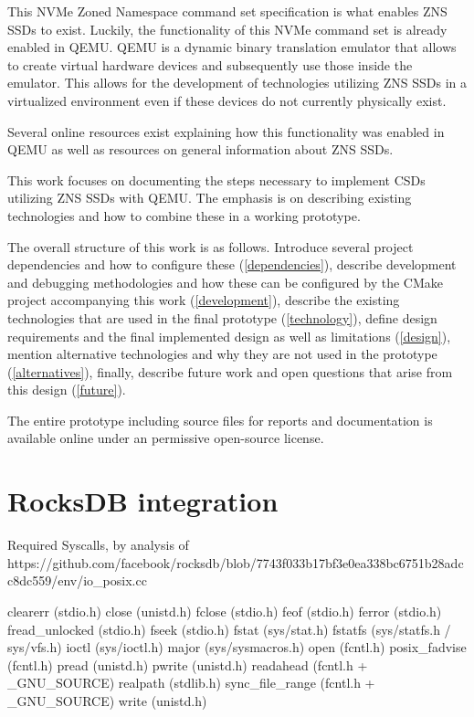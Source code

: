 \documentclass[conference]{IEEEtran}
\begin{document}
This NVMe Zoned Namespace command set specification is what enables ZNS SSDs to
exist\cite{nvme-zns}. Luckily, the functionality of this NVMe command set is
already enabled in QEMU. QEMU is a dynamic binary translation emulator that
allows to create virtual hardware devices and subsequently use those inside the
emulator. This allows for the development of technologies utilizing ZNS SSDs in
a virtualized environment even if these devices do not currently physically
exist.

Several online resources exist explaining how this functionality was enabled in
QEMU\cite{nvme-qemu-1,nvme-qemu-2} as well as resources on general information
about ZNS SSDs\cite{zns-info}.

This work focuses on documenting the steps necessary to implement CSDs
utilizing ZNS SSDs with QEMU. The emphasis is on describing existing
technologies and how to combine these in a working prototype.

The overall structure of this work is as follows. Introduce several project
dependencies and how to configure these (\cref{dependencies}), describe
development and debugging methodologies and how these can be configured by
the CMake project accompanying this work (\cref{development}), describe the
existing technologies that are used in the final prototype (\cref{technology}),
define design requirements and the final implemented design as well as
limitations (\cref{design}), mention alternative technologies and why they
are not used in the prototype (\cref{alternatives}), finally, describe future
work and open questions that arise from this design (\cref{future}).

The entire prototype including source files for reports and documentation
is available online under an permissive open-source license\cite{qemu-csd}.

\section{RocksDB integration}

Required Syscalls, by analysis of https://github.com/facebook/rocksdb/blob/7743f033b17bf3e0ea338bc6751b28adcc8dc559/env/io_posix.cc

clearerr (stdio.h)
close (unistd.h)
fclose (stdio.h)
feof (stdio.h)
ferror (stdio.h)
fread_unlocked (stdio.h)
fseek (stdio.h)
fstat (sys/stat.h)
fstatfs (sys/statfs.h / sys/vfs.h)
ioctl (sys/ioctl.h)
major (sys/sysmacros.h)
open (fcntl.h)
posix_fadvise (fcntl.h)
pread (unistd.h)
pwrite (unistd.h)
readahead (fcntl.h + _GNU_SOURCE)
realpath (stdlib.h)
sync_file_range (fcntl.h + _GNU_SOURCE)
write (unistd.h)
\end{document}
